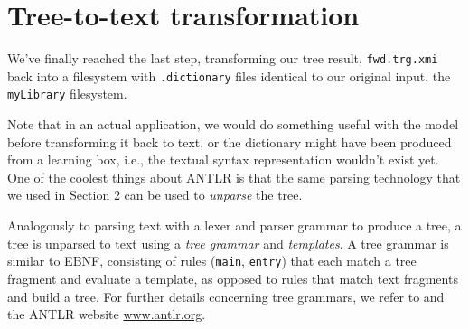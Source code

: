\newpage
\hypertarget{finalStep}{}
\section{Tree-to-text transformation}
\genHeader

We've finally reached the last step, transforming our tree result, \texttt{fwd.trg.xmi} back into a filesystem with \texttt{.dictionary} files identical to our
original input, the \texttt{myLibrary} filesystem.

Note that in an actual application, we would do something useful with the model before transforming it back to text, or the dictionary might have been produced
from a learning box, i.e., the textual syntax representation wouldn't exist yet. One of the coolest things about ANTLR is that the same parsing technology that
we used in Section 2 can be used to \emph{unparse} the tree.

Analogously to parsing text with a lexer and parser grammar to produce a tree, a tree is unparsed to text using a \emph{tree grammar} and \emph{templates}. A
tree grammar is similar to EBNF, consisting of rules (\texttt{main}, \texttt{entry}) that each match a tree fragment and evaluate a template, as
opposed to rules that match text fragments and build a tree. For further details concerning tree grammars, we refer to \cite{ANTLR} and the ANTLR
website \url{www.antlr.org}.

